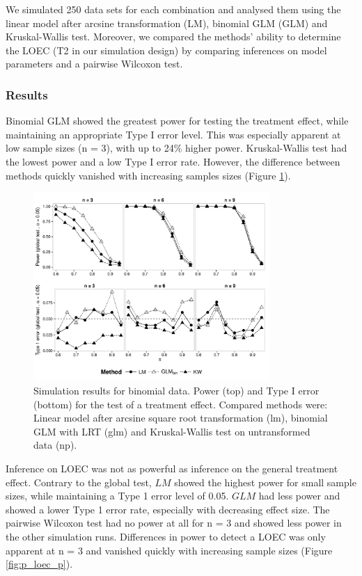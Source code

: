 \documentclass{scrartcl}
\begin{document}
We simulated 250 data sets for each combination and analysed them using the linear model after arcsine transformation (LM), binomial GLM (GLM) and Kruskal-Wallis test.
Moreover, we compared the methods' ability to determine the LOEC (T2 in our simulation design) by comparing inferences on model parameters and a pairwise Wilcoxon test. 


\subsubsection{Results}
Binomial GLM showed the greatest power for testing the treatment effect, while maintaining an appropriate Type I error level.
This was especially apparent at low sample sizes (n = 3), with up to 24\% higher power.
Kruskal-Wallis test had the lowest power and a low Type I error rate.
However, the difference between methods quickly vanished with increasing samples sizes (Figure \ref{fig:p_glob_p}).

\begin{figure}
  \centering
  \includegraphics[width = 0.8\textwidth]{p_glob_p.pdf}
  \caption{Simulation results for binomial data. Power (top) and Type I error (bottom) for the test of a treatment effect. Compared methods were: Linear model after arcsine square root transformation (lm), binomial GLM with LRT (glm) and Kruskal-Wallis test on untransformed data (np).}
  \label{fig:p_glob_p}
\end{figure}

Inference on LOEC was not as powerful as inference on the general treatment effect.
Contrary to the global test, $LM$ showed the highest power for small sample sizes, while maintaining a Type 1 error level of 0.05.
$GLM$ had less power and showed a lower Type 1 error rate, especially with decreasing effect size.
The pairwise Wilcoxon test had no power at all for n = 3 and showed less power in the other simulation runs.
Differences in power to detect a LOEC was only apparent at n = 3 and vanished quickly with increasing sample sizes (Figure \ref{fig:p_loec_p}). 
\end{document}
